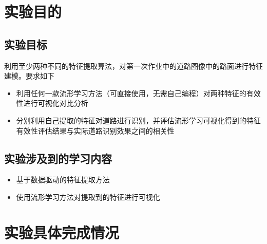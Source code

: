 \documentclass[12pt,hyperref,a4paper,UTF8]{ctexart}
\begin{document}
 
\cover

%
%

\thispagestyle{empty} %


\newpage
\thispagestyle{secondpage}
\section{实验目的}
\subsection{实验目标}
	利用至少两种不同的特征提取算法，对第一次作业中的道路图像中的路面进行特征建模。要求如下
\begin{itemize}	
	\item 利用任何一款流形学习方法（可直接使用，无需自己编程）对两种特征的有效性进行可视化对比分析
	\item 分别利用自己提取的特征对道路进行识别，并评估流形学习可视化得到的特征有效性评估结果与实际道路识别效果之间的相关性
	
\end{itemize}
\subsection{实验涉及到的学习内容}
\begin{itemize}
	\item 基于数据驱动的特征提取方法
    \item 使用流形学习方法对提取到的特征进行可视化
\end{itemize}

\section{实验具体完成情况}
\end{document}
